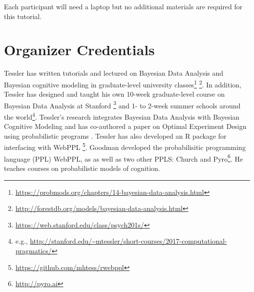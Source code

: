 \documentclass[10pt,letterpaper]{article}
\begin{document}
Each participant will need a laptop but no additional materials are required for this tutorial. 

\section{Organizer Credentials}

Tessler has written tutorials and lectured on Bayesian Data Analysis and Bayesian cognitive modeling in graduate-level university classes\footnote{\url{https://probmods.org/chapters/14-bayesian-data-analysis.html}}
\footnote{\url{http://forestdb.org/models/bayesian-data-analysis.html}}.
In addition, Tessler has designed and taught his own 10-week graduate-level course on Bayesian Data Analysis at Stanford \footnote{
\url{https://web.stanford.edu/class/psych201s/}
} and 1- to 2-week summer schools around the world\footnote{
e.g., \url{http://stanford.edu/~mtessler/short-courses/2017-computational-pragmatics/}}.
Tessler's research integrates Bayesian Data Analysis with Bayesian Cognitive Modeling and has co-authored a paper on Optimal Experiment Design using probabilistic programs \cite{OuyangTLG16}.  
Tessler has also developed an R package for interfacing with WebPPL \footnote{\url{https://github.com/mhtess/rwebppl}}.
Goodman developed the probabilisitic programming language (PPL) WebPPL, as as well as two other PPLS: Church \cite{church} and Pyro\footnote{\url{http://pyro.ai}}.
He teaches courses on probabilistic models of cognition.




\setlength{\bibleftmargin}{.125in}
\setlength{\bibindent}{-\bibleftmargin}


\end{document}
